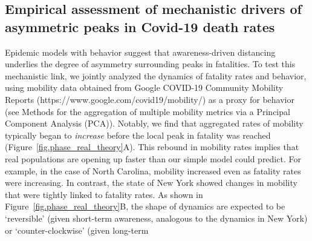 \subsection{Empirical assessment of mechanistic drivers of asymmetric peaks in Covid-19 death rates}

Epidemic models with behavior suggest that 
awareness-driven distancing underlies 
the degree of asymmetry surrounding peaks in fatalities.
To test this mechanistic link, we jointly analyzed the dynamics of fatality
rates and behavior, using mobility
data obtained from Google COVID-19 Community Mobility Reports (https://www.google.com/covid19/mobility/)
as a proxy for behavior (see Methods for the
aggregation of multiple mobility metrics via
a Principal Component Analysis (PCA)).
Notably, we find that aggregated rates of mobility 
typically began to \emph{increase} before
the local peak in fatality was reached (Figure~\ref{fig.phase_real_theory}A).  
This rebound in mobility rates
implies that real populations are opening up faster than our simple model could predict.
For example, in the case of North Carolina, mobility increased even as fatality
rates were increasing. 
In contrast, the state of New York showed changes in mobility that were tightly linked to fatality rates.
As shown in Figure~\ref{fig.phase_real_theory}B,
the shape of dynamics are expected to be `reversible' 
(given short-term awareness, analogous to the dynamics
in New York) or `counter-clockwise' (given long-term
